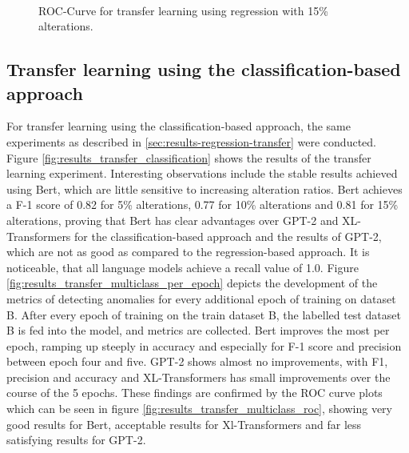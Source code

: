 \begin{figure*}[ht!]
\hspace{\fill}
\hspace{\fill}
   \\
\caption{\label{fig:results_transfer_regression_roc}ROC-Curve for transfer learning using regression with 15\% alterations.}
\end{figure*}



\subsection{Transfer learning using the classification-based approach \label{sec:results-classification-transfer}}

For transfer learning using the classification-based approach, the same experiments as described in \ref{sec:results-regression-transfer} were conducted. Figure \ref{fig:results_transfer_classification} shows the results of the transfer learning experiment. Interesting observations include the stable results achieved using Bert, which are little sensitive to increasing alteration ratios. Bert achieves a F-1 score of 0.82 for 5\% alterations, 0.77 for 10\% alterations and 0.81 for 15\% alterations, proving that Bert has clear advantages over GPT-2 and XL-Transformers for the classification-based approach and the results of GPT-2, which are not as good as compared to the regression-based approach. It is noticeable, that all language models achieve a recall value of 1.0.
Figure \ref{fig:results_transfer_multiclass_per_epoch} depicts the development of the metrics of detecting anomalies for every additional epoch of training on dataset B. After every epoch of training on the train dataset B, the labelled test dataset B is fed into the model, and metrics are collected. Bert improves the most per epoch, ramping up steeply in accuracy and especially for F-1 score and precision between epoch four and five. GPT-2 shows almost no improvements, with F1, precision and accuracy and XL-Transformers has small improvements over the course of the 5 epochs. These findings are confirmed by the ROC curve plots which can be seen in figure \ref{fig:results_transfer_multiclass_roc}, showing very good results for Bert, acceptable results for Xl-Transformers and far less satisfying results for GPT-2.

